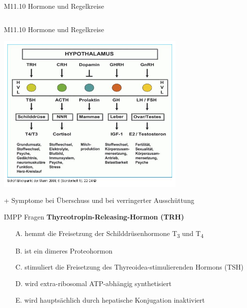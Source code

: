 \documentclass{beamer}
\begin{document}
\begin{frame}{M11.10 Hormone und Regelkreise}
\begin{columns}[c]
\begin{column}{6cm}
\end{column}


\end{columns}

    
\end{frame}


\begin{frame}{M11.10 Hormone und Regelkreise}
\begin{center}
    \includegraphics[width=0.7\textwidth]{hypothalamus_hypophyse.png}
\end{center}

+ Symptome bei Überschuss und bei verringerter Ausschüttung

\end{frame}




\begin{frame}{IMPP Fragen}
\textbf{
Thyreotropin-Releasing-Hormon (TRH)} \\[0.2 cm]

\begin{itemize}
\item[A.] hemmt die Freisetzung der Schilddrüsenhormone T\textsubscript{3} und T\textsubscript{4}
\item[B.] ist ein dimeres Proteohormon
\item[C.] stimuliert die Freisetzung des Thyreoidea-stimulierenden Hormons (TSH) %
\item[D.] wird extra-ribosomal ATP-abhängig synthetisiert
\item[E.] wird hauptsächlich durch hepatische Konjugation inaktiviert 

\end{itemize}
    
\end{frame}
\end{document}
